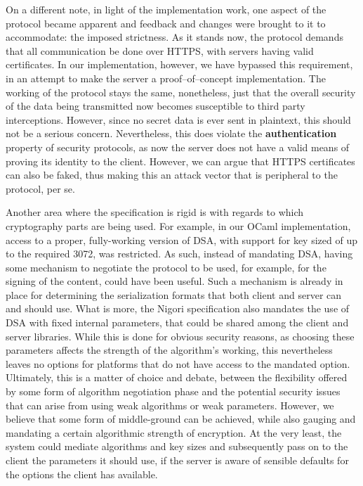 On a different note, in light of the implementation work, one aspect of the protocol became apparent and feedback and changes were brought to it to accommodate: the imposed strictness.
As it stands now, the protocol demands that all communication be done over HTTPS, with servers having valid certificates.
In our implementation, however, we have bypassed this requirement, in an attempt to make the server a proof--of--concept implementation.
The working of the protocol stays the same, nonetheless, just that the overall security of the data being transmitted now becomes susceptible to third party interceptions.
However, since no secret data is ever sent in plaintext, this should not be a serious concern.
Nevertheless, this does violate the \textbf{authentication} property of security protocols, as now the server does not have a valid means of proving its identity to the client.
However, we can argue that HTTPS certificates can also be faked, thus making this an attack vector that is peripheral to the protocol, per se.

Another area where the specification is rigid is with regards to which cryptography parts are being used.
For example, in our OCaml implementation, access to a proper, fully-working version of DSA, with support for key sized of up to the required 3072, was restricted.
As such, instead of mandating DSA, having some mechanism to negotiate the protocol to be used, for example, for the signing of the content, could have been useful.
Such a mechanism is already in place for determining the serialization formats that both client and server can and should use.
What is more, the Nigori specification also mandates the use of DSA with fixed internal parameters, that could be shared among the client and server libraries.
While this is done for obvious security reasons, as choosing these parameters affects the strength of the algorithm's working, this nevertheless leaves no options for platforms that do not have access to the mandated option.
Ultimately, this is a matter of choice and debate, between the flexibility offered by some form of algorithm negotiation phase and the potential security issues that can arise from using weak algorithms or weak parameters.
However, we believe that some form of middle-ground can be achieved, while also gauging and mandating a certain algorithmic strength of encryption.
At the very least, the system could mediate algorithms and key sizes and subsequently pass on to the client the parameters it should use, if the server is aware of sensible defaults for the options the client has available.

